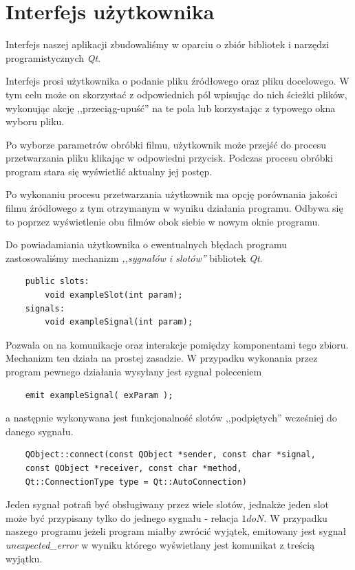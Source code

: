 \documentclass[twoside]{projektInzynierskiMS}
\begin{document}
\section{Interfejs użytkownika}
Interfejs naszej aplikacji zbudowaliśmy w oparciu o zbiór bibliotek i narzędzi programistycznych \emph{Qt}.
\begin{figure}
\end{figure}
Interfejs prosi użytkownika o podanie pliku źródłowego oraz pliku docelowego. W tym celu może on skorzystać z odpowiednich pól wpisując do nich ścieżki plików, wykonując akcję ,,przeciąg-upuść'' na te pola lub  korzystając z typowego okna wyboru pliku.
\begin{figure}
\end{figure}
Po wyborze parametrów obróbki filmu, użytkownik może przejść do procesu przetwarzania pliku klikając w odpowiedni przycisk. Podczas procesu obróbki program stara się wyświetlić aktualny jej postęp.

Po wykonaniu procesu przetwarzania użytkownik ma opcję porównania jakości filmu źródłowego z tym otrzymanym w wyniku działania programu. Odbywa się to poprzez wyświetlenie obu filmów obok siebie w nowym oknie programu.
\begin{figure}
\end{figure}

Do powiadamiania użytkownika o ewentualnych błędach programu zastosowaliśmy mechanizm \emph{,,sygnałów i slotów''} bibliotek \emph{Qt}. 
\begin{verbatim}
	public slots:
	    void exampleSlot(int param);
	signals:
	    void exampleSignal(int param);
\end{verbatim}
Pozwala on na komunikacje oraz interakcje pomiędzy komponentami tego zbioru. Mechanizm ten działa na prostej zasadzie. W przypadku wykonania przez program pewnego działania wysyłany jest sygnał poleceniem
\begin{verbatim}
	emit exampleSignal( exParam );
\end{verbatim}
a następnie wykonywana jest funkcjonalność slotów ,,podpiętych'' wcześniej do danego sygnału. 
\begin{verbatim}
	QObject::connect(const QObject *sender, const char *signal, 
	const QObject *receiver, const char *method, 
	Qt::ConnectionType type = Qt::AutoConnection)
\end{verbatim}
Jeden sygnał potrafi być obsługiwany przez wiele slotów, jednakże jeden slot może być przypisany tylko do jednego sygnału - relacja $1 do N$.
W przypadku naszego programu jeżeli program miałby zwrócić wyjątek, emitowany jest sygnał \emph{unexpected\_error} w wyniku którego wyświetlany jest komunikat z treścią wyjątku.
\end{document}
